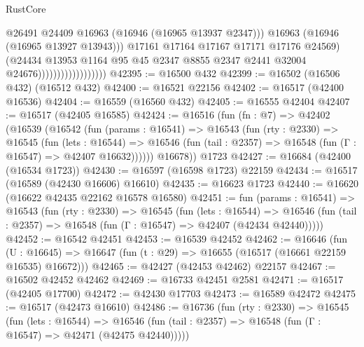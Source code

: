 \begin{lexlean}{RustCore}
\begin{coremodule}
                                            @26491
                                            @24409
                                            @16963
                                            (@16946 (@16965 @13937 @2347)))
                                          @16963
                                          (@16946 (@16965 @13927 @13943)))
                                        @17161
                                        @17164
                                        @17167
                                        @17171
                                        @17176
                                        @24569)
                                      (@24434
                                        @13953
                                        @1164
                                        @95
                                        @45
                                        @2347
                                        @8855
                                        @2347
                                        @2441
                                        @32004
                                        @24676))))))))))))))))))
@42395 := @16500 @432
@42399 := @16502 (@16506 @432) (@16512 @432)
@42400 := @16521 @22156
@42402 := @16517 (@42400 @16536)
@42404 := @16559 (@16560 @432)
@42405 := @16555 @42404
@42407 := @16517 (@42405 @16585)
@42424 := @16516
    (fun (fn : @7) =>
    @42402
      (@16539
        (@16542
          (fun (params : @16541) =>
          @16543
            (fun (rty : @2330) =>
            @16545
              (fun (lets : @16544) =>
              @16546 (fun (tail : @2357) => @16548 (fun (Γ : @16547) => @42407 @16632))))))
        @16678))
    @1723
@42427 := @16684 (@42400 (@16534 @1723))
@42430 := @16597 (@16598 @1723) @22159
@42434 := @16517 (@16589 (@42430 @16606) @16610)
@42435 := @16623 @1723
@42440 := @16620 (@16622 @42435 @22162 @16578 @16580)
@42451 := fun (params : @16541) =>
  @16543
    (fun (rty : @2330) =>
    @16545
      (fun (lets : @16544) =>
      @16546 (fun (tail : @2357) => @16548 (fun (Γ : @16547) => @42407 (@42434 @42440)))))
@42452 := @16542 @42451
@42453 := @16539 @42452
@42462 := @16646
    (fun (U : @16645) => @16647 (fun (t : @29) => @16655 (@16517 (@16661 @22159 @16535) @16672)))
@42465 := @42427 (@42453 @42462) @22157
@42467 := @16502 @42452 @42462
@42469 := @16733 @42451 @2581
@42471 := @16517 (@42405 @17700)
@42472 := @42430 @17703
@42473 := @16589 @42472
@42475 := @16517 (@42473 @16610)
@42486 := @16736
    (fun (rty : @2330) =>
    @16545
      (fun (lets : @16544) =>
      @16546 (fun (tail : @2357) => @16548 (fun (Γ : @16547) => @42471 (@42475 @42440)))))

\end{coremodule}
\end{lexlean}
